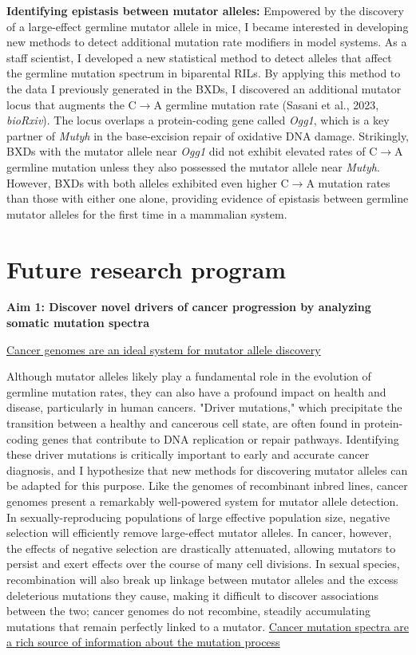 \documentclass[11pt,a4paper,sans]{moderncv}
\begin{document}
\break \break
\textbf{Identifying epistasis between mutator alleles:}  Empowered by the 
discovery of a large-effect germline mutator allele in mice, I became interested 
in developing new methods to detect additional mutation 
rate modifiers in model systems. As a staff scientist, I developed a new 
statistical method to detect alleles that affect the germline mutation spectrum 
in biparental RILs. By applying this method to the data I previously generated 
in the BXDs, I discovered an additional mutator locus that augments the C$\rightarrow$A 
germline mutation rate (Sasani et al., 2023, \emph{bioRxiv}). The locus overlaps a 
protein-coding gene called \emph{Ogg1}, which is a key partner of \emph{Mutyh} in the 
base-excision repair of oxidative DNA damage. Strikingly, BXDs with the mutator 
allele near \emph{Ogg1} did not exhibit elevated rates of C$\rightarrow$A germline mutation unless 
they also possessed the mutator allele near \emph{Mutyh}. However, BXDs with both 
alleles exhibited even higher C$\rightarrow$A mutation rates than those with either one 
alone, providing evidence of epistasis between germline mutator alleles for 
the first time in a mammalian system.

\section{Future research program}

\textbf{Aim 1: Discover novel drivers of cancer progression by analyzing somatic 
mutation spectra}

\underline{Cancer genomes are an ideal system for mutator allele discovery}

Although mutator alleles likely play a fundamental role in the evolution of 
germline mutation rates, they can also have a profound impact on health and disease, 
particularly in human cancers. "Driver mutations," which precipitate the transition
between a healthy and cancerous cell state, are often found in protein-coding genes
that contribute to DNA replication or repair pathways. Identifying these driver
mutations is critically important to early and accurate cancer diagnosis, and 
I hypothesize that new methods for discovering mutator alleles can be adapted 
for this purpose. Like the genomes of recombinant inbred lines, cancer genomes 
present a remarkably well-powered system for mutator allele detection. In 
sexually-reproducing populations of large effective population size, negative 
selection will efficiently remove large-effect mutator alleles. In cancer, 
however, the effects of negative selection are drastically attenuated, allowing 
mutators to persist and exert effects over the course of many cell divisions. 
In sexual species, recombination will also break up linkage between mutator 
alleles and the excess deleterious mutations they cause, making it difficult to
discover associations between the two; cancer genomes do not recombine, steadily
accumulating mutations that remain perfectly linked to a mutator. 
\break \break
\underline{Cancer mutation spectra are a rich source of information about the mutation process}
\end{document}
